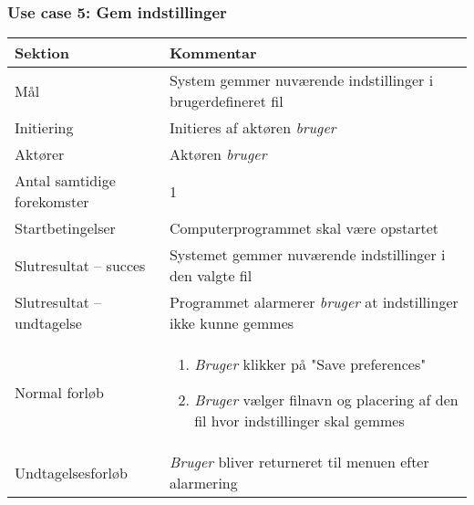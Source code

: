\documentclass[kravspec.tex]{subfiles}
\begin{document}
	\subsubsection{Use case 5: Gem indstillinger}
	\begin{tabular}{|l|p{7.7cm}|}
		\hline \textbf{Sektion} 	& \textbf{Kommentar} \\ 
		\hline Mål  & System gemmer nuværende indstillinger i brugerdefineret fil \\ 
		\hline Initiering  & Initieres af aktøren \textit{bruger} \\ 
		\hline Aktører & Aktøren \textit{bruger} \\ 
		\hline Antal samtidige forekomster & 1 \\ 
		\hline Startbetingelser & Computerprogrammet skal være opstartet \\ 
		\hline Slutresultat – succes & Systemet gemmer nuværende indstillinger i den valgte fil \\ 
		\hline Slutresultat – undtagelse & Programmet alarmerer \textit{bruger} at indstillinger ikke kunne gemmes \\ 
		\hline Normal forløb & \begin{enumerate}
			\item \textit{Bruger} klikker på "Save preferences"
			\item \textit{Bruger} vælger filnavn og placering af den fil hvor indstillinger skal gemmes
		\end{enumerate} \\ 
		\hline Undtagelsesforløb & \textit{Bruger} bliver returneret til menuen efter alarmering \\ 
		\hline 
	\end{tabular}
	
\end{document}
